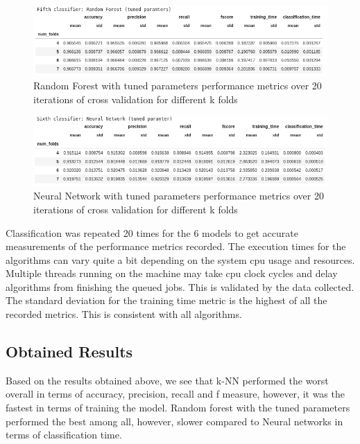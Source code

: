 \begin{figure}[!ht]
 \centering
\includegraphics[width=\textwidth]{assignment2/2-4-run5.png}
\caption{\label{fig:run5} Random Forest with tuned parameters performance metrics over 20 iterations of cross validation for different k folds}
\end{figure}

\begin{figure}[!ht]
 \centering
\includegraphics[width=\textwidth]{assignment2/2-4-run6.png}
\caption{\label{fig:run6} Neural Network with tuned parameters performance metrics over 20 iterations of cross validation for different k folds}
\end{figure}

\clearpage{}
Classification was repeated 20 times for the 6 models to get accurate measurements of the performance metrics recorded. The execution times for the algorithms can vary quite a bit depending on the system cpu usage and resources. Multiple threads running on the machine may take cpu clock cycles and delay algorithms from finishing the queued jobs. This is validated by the data collected. The standard deviation for the training time metric is the highest of all the recorded metrics. This is consistent with all algorithms.

\subsection{Obtained Results}

Based on the results obtained above, we see that k-NN performed the worst overall in terms of accuracy, precision, recall and f measure, however, it was the fastest in terms of training the model. Random forest with the tuned parameters performed the best among all, however, slower compared to Neural networks in terms of classification time. 

